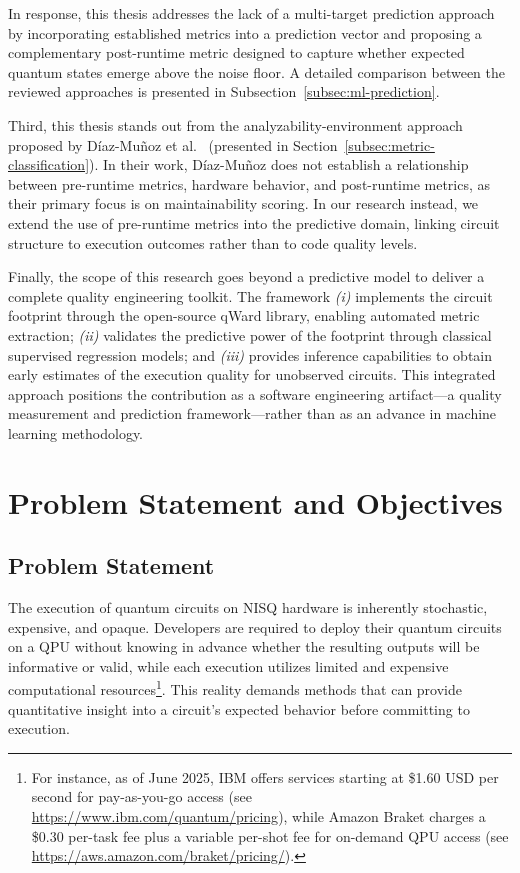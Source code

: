 \documentclass{article}
\begin{document}
In response, this thesis addresses the lack of a multi-target prediction approach by incorporating established metrics into a prediction vector and proposing a complementary post-runtime metric designed to capture whether expected quantum states emerge above the noise floor. A detailed comparison between the reviewed approaches is presented in Subsection~\ref{subsec:ml-prediction}.

Third, this thesis stands out from the analyzability-environment approach proposed by Díaz-Muñoz et al.~\cite{diazMunozEnvironmentEvaluation_2025} (presented in Section~\ref{subsec:metric-classification}). In their work, Díaz-Muñoz does not establish a relationship between pre-runtime metrics, hardware behavior, and post-runtime metrics, as their primary focus is on maintainability scoring. In our research instead, we extend the use of pre-runtime metrics into the predictive domain, linking circuit structure to execution outcomes rather than to code quality levels.

Finally, the scope of this research goes beyond a predictive model to deliver a complete quality engineering toolkit. The framework \emph{(i)} implements the circuit footprint through the open-source qWard library, enabling automated metric extraction; \emph{(ii)} validates the predictive power of the footprint through classical supervised regression models; and \emph{(iii)} provides inference capabilities to obtain early estimates of the execution quality for unobserved circuits. This integrated approach positions the contribution as a software engineering artifact---a quality measurement and prediction framework---rather than as an advance in machine learning methodology.

\section{Problem Statement and Objectives}
\label{section:problem-statement}

\subsection{Problem Statement}

The execution of quantum circuits on NISQ hardware is inherently stochastic, expensive, and opaque. Developers are required to deploy their quantum circuits on a QPU without knowing in advance whether the resulting outputs will be informative or valid, while each execution utilizes limited and expensive computational resources\footnote{For instance, as of June 2025, IBM offers services starting at \$1.60 USD per second for pay-as-you-go access (see \url{https://www.ibm.com/quantum/pricing}), while Amazon Braket charges a \$0.30 per-task fee plus a variable per-shot fee for on-demand QPU access (see \url{https://aws.amazon.com/braket/pricing/}).}. This reality demands methods that can provide quantitative insight into a circuit's expected behavior before committing to execution.
\end{document}
